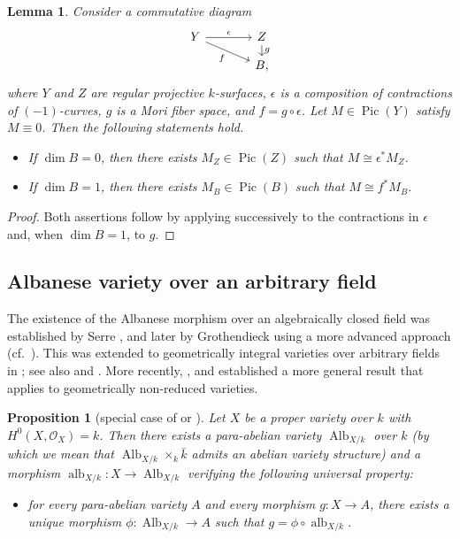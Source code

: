 \documentclass[10pt,abstract=true]{scrartcl}
\numberwithin{equation}{section}
\newtheorem{lemma}[theorem]{Lemma}
\newtheorem{proposition}[theorem]{Proposition}
\theoremstyle{definition}
\theoremstyle{remark}
\DeclareMathOperator\Alb{Alb}
\DeclareMathOperator\alb{alb}
\DeclareMathOperator\Pic{Pic}
\begin{document}
\begin{lemma}\label{lemm:descent-div}%
  Consider a commutative diagram
  \[
    \begin{tikzcd}[column sep=large,row sep=small]
       Y \arrow[r,"\epsilon"] \arrow[dr,"f"'] & Z \arrow[d,"g"] \\
      & B,
    \end{tikzcd}
  \]
  where $ Y$ and $Z$ are regular projective $k$-surfaces, $\epsilon$ is a composition of contractions of $(-1)$-curves, $g$ is a Mori fiber space, and $f=g\circ\epsilon$.
  Let $M\in\operatorname{Pic}( Y)$ satisfy $M\equiv0$.
  Then the following statements hold.
  \begin{itemize}
    \item[\textup{(1)}] If $\dim B=0$, then there exists $M_Z\in \Pic(Z)$ such that $M\cong\epsilon^*M_Z$.
    \item[\textup{(2)}] If $\dim B=1$, then there exists $M_B\in \Pic(B)$ such that $M\cong f^*M_B$.
  \end{itemize}
\end{lemma}
\begin{proof}
  Both assertions follow by applying \cite[Theorem~4.4\textup{(3)}]{Tanaka-2018-MMP-excelent-surface} successively to the contractions in $\epsilon$ and, when $\dim B=1$, to $g$.
\end{proof}

\subsection{Albanese variety over an arbitrary field}\label{sec:Alb}%
The existence of the Albanese morphism over an algebraically closed field was established by Serre \cite{Serre59-Alb}, and later by Grothendieck using a more advanced approach (cf.~\cite[\S9.5]{FGAexplained}).
This was extended to geometrically integral varieties over arbitrary fields in \cite[Appendix~A]{Wittenberg-2008}; see also \cite{Conrad-Alb} and \cite[\S1]{Laurent-2022}.
More recently, \cite{Laurent-Schroer-2024}, \cite{schroer_albanese_2024} and \cite[\S2.2]{AC-MV-25} established a more general result that applies to geometrically non-reduced varieties.
\begin{proposition}[special case of {\cite[Theorem~10.2]{Laurent-Schroer-2024}} or {\cite[Theorem~5.4]{schroer_albanese_2024}}]
  Let $X$ be a proper variety over $k$ with $H^0(X,\mathcal O_X) = k$.
  Then there exists a {\em para-abelian variety} $\Alb_{X/k}$ over $k$ (by which we mean that $\Alb_{X/k} \times_k \bar k$ admits an abelian variety structure) and a morphism $\alb_{X/k}\colon X\to \Alb_{X/k}$ verifying the following universal property:
  \begin{itemize}
    \item for every para-abelian variety $A$ and every morphism $g\colon X\to A$, there exists a unique morphism $\phi\colon \Alb_{X/k}\to A$ such that $g = \phi \circ \alb_{X/k}$.
  \end{itemize}
\end{proposition}
\end{document}
